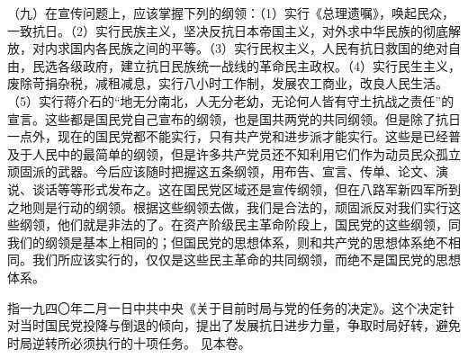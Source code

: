 （九）在宣传问题上，应该掌握下列的纲领：（1）实行《总理遗嘱》，唤起民众，一致抗日。（2）实行民族主义，坚决反抗日本帝国主义，对外求中华民族的彻底解放，对内求国内各民族之间的平等。（3）实行民权主义，人民有抗日救国的绝对自由，民选各级政府，建立抗日民族统一战线的革命民主政权。（4）实行民生主义，废除苛捐杂税，减租减息，实行八小时工作制，发展农工商业，改良人民生活。（5）实行蒋介石的“地无分南北，人无分老幼，无论何人皆有守土抗战之责任”的宣言。这些都是国民党自己宣布的纲领，也是国共两党的共同纲领。但是除了抗日一点外，现在的国民党都不能实行，只有共产党和进步派才能实行。这些是已经普及于人民中的最简单的纲领，但是许多共产党员还不知利用它们作为动员民众孤立顽固派的武器。今后应该随时把握这五条纲领，用布告、宣言、传单、论文、演说、谈话等等形式发布之。这在国民党区域还是宣传纲领，但在八路军新四军所到之地则是行动的纲领。根据这些纲领去做，我们是合法的，顽固派反对我们实行这些纲领，他们就是非法的了。在资产阶级民主革命阶段上，国民党的这些纲领，同我们的纲领是基本上相同的；但国民党的思想体系，则和共产党的思想体系绝不相同。我们所应该实行的，仅仅是这些民主革命的共同纲领，而绝不是国民党的思想体系。


\begin{maonote}
指一九四〇年二月一日中共中央《关于目前时局与党的任务的决定》。这个决定针对当时国民党投降与倒退的倾向，提出了发展抗日进步力量，争取时局好转，避免时局逆转所必须执行的十项任务。
见本卷。
\end{maonote}
